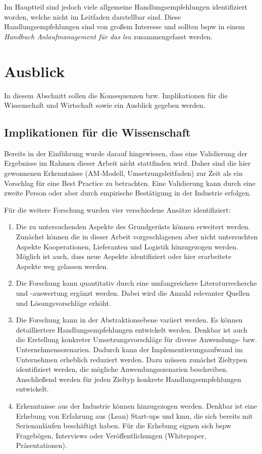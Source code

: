 Im Hauptteil sind jedoch viele allgemeine Handlungsempfehlungen identifiziert worden, welche nicht im Leitfaden darstellbar sind. Diese Handlungsempfehlungen sind von großem Interesse und sollten \gls{bspw} in einem \textit{Handbuch Anlaufmanagement für das \gls{lsu}} zusammengefasst werden. 

\section{Ausblick}

In diesem Abschnitt sollen die Konsequenzen bzw. Implikationen für die Wissenschaft und Wirtschaft sowie ein Ausblick gegeben werden. 

\subsection*{Implikationen für die Wissenschaft}
Bereits in der Einführung wurde darauf hingewiesen, dass eine Validierung der Ergebnisse im Rahmen dieser Arbeit nicht stattfinden wird. Daher sind die hier gewonnenen Erkenntnisse (AM-Modell, Umsetzungsleitfaden) zur Zeit als ein Vorschlag für eine Best Practice zu betrachten. Eine Validierung kann durch eine zweite Person %
oder aber durch empirische Bestätigung in der Industrie erfolgen. 

Für die weitere Forschung wurden vier verschiedene Ansätze identifiziert: 

\begin{enumerate}
 \item Die zu untersuchenden Aspekte des Grundgerüsts können erweitert werden. Zunächst können die in dieser Arbeit vorgeschlagenen aber nicht untersuchten Aspekte Kooperationen, Lieferanten und Logistik %
 hinzugezogen werden. Möglich ist auch, dass neue Aspekte identifiziert oder hier erarbeitete Aspekte weg gelassen werden. %
\item Die Forschung kann quantitativ durch eine umfangreichere Literaturrecherche und -auswertung ergänzt werden. Dabei wird die Anzahl relevanter Quellen und Lösungsvorschläge erhöht. 
\item Die Forschung kann in der Abstraktionsebene variiert werden. Es können detailliertere Handlungsempfehlungen entwickelt werden. Denkbar ist auch die Erstellung konkreter Umsetzungsvorschläge für diverse Anwendungs- bzw. Unternehmensszenarien. Dadurch kann der Implementierungsaufwand im Unternehmen erheblich reduziert werden. Dazu müssen zunächst Zieltypen identifiziert werden, die mögliche Anwendungsszenarien beschreiben. Anschließend werden für jeden Zieltyp konkrete Handlungsempfehlungen entwickelt. 
\item Erkenntnisse aus der Industrie können hinzugezogen werden. Denkbar ist eine Erhebung von Erfahrung aus (Lean) Start-ups und \gls{kmu}, die sich bereits mit Serienanläufen beschäftigt haben. Für die Erhebung eignen sich \gls{bspw} Fragebögen, Interviews oder Veröffentlichungen (Whitepaper, Präsentationen). 
\end{enumerate}



